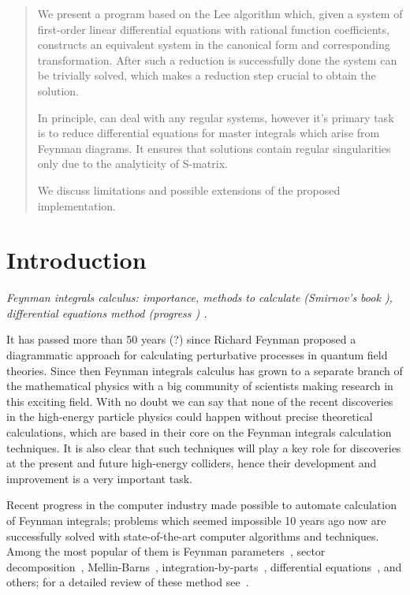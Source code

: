 \documentclass[12pt,a4paper]{article}
\begin{document}
\maketitle
\thispagestyle{empty}

\begin{abstract}
We present a program \fuchsia based on the Lee algorithm \cite{Lee15} which, given a system of first-order linear differential equations with rational function coefficients, constructs an equivalent system in the canonical form and corresponding transformation.
After such a reduction is successfully done the system can be trivially solved, which makes a reduction step crucial to obtain the solution.

In principle, \fuchsia can deal with any regular systems, however it's primary task is to reduce differential equations for master integrals which arise from Feynman diagrams.
It ensures that solutions contain regular singularities only due to the analyticity of S-matrix.

We discuss limitations and possible extensions of the proposed implementation.
\end{abstract}
\newpage


\newpage

\tableofcontents

\section{Introduction}

{\it Feynman integrals calculus: importance, methods to calculate (Smirnov's book \cite{Smi06}), differential equations method (progress \cite{Henn14}) .}

It has passed more than 50 years (?) since Richard Feynman proposed a diagrammatic approach for calculating perturbative processes in quantum field theories.
Since then Feynman integrals calculus has grown to a separate branch of the mathematical physics with a big community of scientists making research in this exciting field.
With no doubt we can say that none of the recent discoveries in the high-energy particle physics could happen without precise theoretical calculations, which are based in their core on the Feynman integrals calculation techniques. 
It is also clear that such techniques will play a key role for discoveries at the present and future high-energy colliders, hence their development and improvement is a very important task.

Recent progress in the computer industry made possible to automate calculation of Feynman integrals; problems which seemed impossible 10 years ago now are successfully solved with state-of-the-art computer algorithms and techniques.
Among the most popular of them is Feynman parameters~\cite{}, sector decomposition~\cite{}, Mellin-Barns~\cite{}, integration-by-parts~\cite{}, differential equations~\cite{}, and others; for a detailed review of these method see~\cite{Smi06}.
\end{document}
